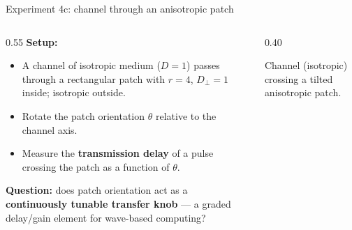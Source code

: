 \documentclass[aspectratio=169,11pt]{beamer}
\begin{document}
\begin{frame}{Experiment 4c: channel through an anisotropic patch}

\begin{columns}
\begin{column}{0.55\textwidth}
\textbf{Setup:}
\begin{itemize}
    \item A channel of isotropic medium ($D = 1$) passes through a rectangular patch with $r = 4$, $D_\perp = 1$ inside; isotropic outside.
    \item Rotate the patch orientation $\theta$ relative to the channel axis.
    \item Measure the \textbf{transmission delay} of a pulse crossing the patch as a function of $\theta$.
\end{itemize}

\vspace{0.3cm}
\textbf{Question:} does patch orientation act as a \textbf{continuously tunable transfer knob} --- a graded delay/gain element for wave-based computing?
\end{column}

\begin{column}{0.40\textwidth}
\centering
{}

\vspace{0.1cm}
{\footnotesize Channel (isotropic) crossing a tilted anisotropic patch.}
\end{column}
\end{columns}

\end{frame}
\end{document}
